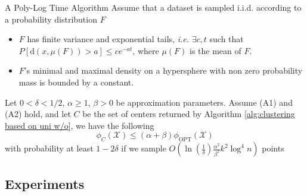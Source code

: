 \documentclass{beamer}
\begin{document}
\begin{frame}{A Poly-Log Time Algorithm}
	Assume that a dataset is sampled i.i.d. according to a
	probability distribution $F$
	\begin{itemize}
		\item $F$ has finite variance and exponential tails, \textit{i.e.} $\exists c,t$ such that $P[\text{d}(x,\mu(F))>a]\leq ce^{-at}$, where $\mu(F)$ is the mean of $F$.
		\item $F$'s minimal and maximal density on a hypersphere with non zero probability mass is bounded by a constant.
	\end{itemize}
	\begin{theorem}
		\small
		Let $0 < \delta <1/2$, $\alpha \geq 1$, $\beta >0$ be approximation parameters. Assume (A1) and (A2) hold, and let $C$ be the set of centers returned by Algorithm \ref{alg:clustering based on uni w/o}, we have the following 
		\begin{equation*}
		\phi_C(\mathcal{X}) \leq (\alpha + \beta)\phi_\text{OPT}(\mathcal{X})
		\end{equation*}
		with probability at least $1-2\delta$ if we sample $O(\ln(\frac{1}{\delta})\frac{\alpha^2}{\beta^2}k^2\log^4 n)$ points
	\end{theorem}
\end{frame}

\subsection{Experiments}
\end{document}
